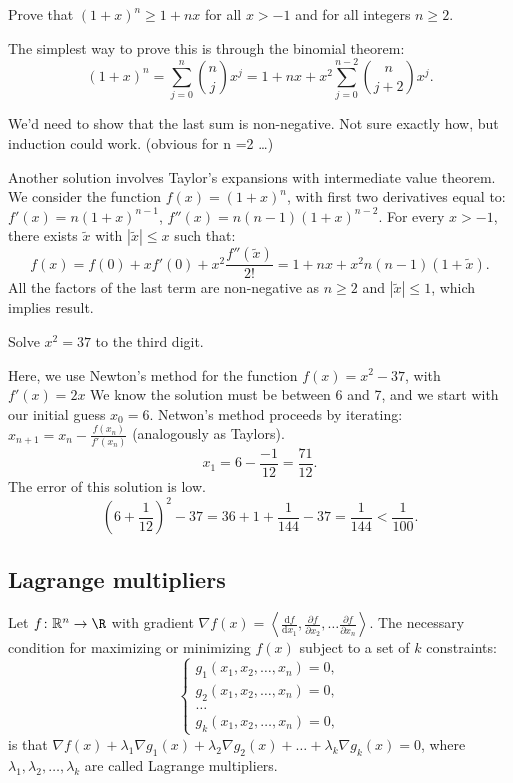 \begin{qanda}
  \Q 
  Prove that $(1+x)^n \geq 1 + nx$ for all $x>-1$ and for all integers $n\geq 2$.

  \A
  The simplest way to prove this is through the binomial theorem:
  \[
      (1 + x)^n = \sum_{j=0}^{n} \binom{n}{j} x^j = 1 + nx + x^2\sum_{j=0}^{n-2} \binom{n}{j+2} x^j.
  \]

  We'd need to show that the last sum is non-negative. Not sure exactly how, but induction could work. (obvious for n =2 \ldots)

  Another solution involves Taylor's expansions with intermediate value theorem.
  We consider the function $f(x) = (1 + x)^n$, with first two derivatives equal to: 
  $f'(x) = n (1 + x)^{n-1}$,
  $f''(x) = n(n-1) (1 + x)^{n-2}$.
  For every $x> -1$, there exists $\tilde{x}$ with $|\tilde{x}| \leq x$ such that:
    \[
    f(x) = f(0) + x f'(0) + x^2 \frac{f''(\tilde{x})}{2!} = 1 + nx + x^2 n(n-1)(1+\tilde{x}).
    \]
    All the factors of the last term are non-negative as $n\geq 2$ and $|\tilde{x}| \leq1$, which implies result.
\end{qanda}

\begin{qanda}
    \Q
    Solve $x^2 = 37$ to the third digit.

    \A
    Here, we use Newton's method for the function $f(x) = x^2 - 37$, with $f'(x)=2x$
    We know the solution must be between 6 and 7, and we start with our initial guess $x_0 = 6$.
    Netwon's method proceeds by iterating: $x_{n+1} = x_n - \frac{f(x_n)}{f'(x_n)}$ (analogously as Taylors).
    \[
    x_1 = 6 - \frac{-1}{12} = \frac{71}{12}.
    \]
    The error of this solution is low.
    \[
        \left( 6 + \frac{1}{12} \right)^2 - 37 = 36 + 1 + \frac{1}{144} - 37 = \frac{1}{144} < \frac{1}{100}.
    \]
\end{qanda}


\subsection{Lagrange multipliers}

Let $f\colon \mathbb{R}^n \to \R$ with gradient $\nabla f(x) = \left\langle \frac{\mathrm{d}f}{\mathrm{d}x_1}, \frac{\partial f }{\partial x_2}, \dots \frac{\partial f }{\partial x_n} \right\rangle$.
The necessary condition for maximizing or minimizing $f(x)$ subject to a set of $k$ constraints:
\[
\begin{cases}
  g_1(x_1, x_2, \dots, x_n) = 0, \\
  g_2(x_1, x_2, \dots, x_n) = 0, \\
  \dots \\
  g_k(x_1, x_2, \dots, x_n) = 0,
\end{cases}
\]
is that $\nabla f(x) + \lambda_1 \nabla g_1(x) + \lambda_2 \nabla g_2(x) + \dots + \lambda_k \nabla g_k(x) = 0$, where $\lambda_1, \lambda_2, \dots, \lambda_k$ are called Lagrange multipliers.

